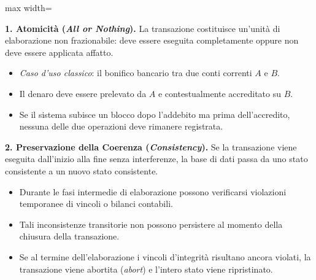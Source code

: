 \documentclass[12pt]{extarticle}
\begin{document}
\begin{center}
\begin{adjustbox}{max width=\linewidth}
\end{adjustbox}
\end{center}

\noindent \textbf{1. Atomicità (\textit{All or Nothing}).} La transazione costituisce un'unità di elaborazione non frazionabile: deve essere eseguita completamente oppure non deve essere applicata affatto.
\begin{itemize}
    \item \textit{Caso d'uso classico}: il bonifico bancario tra due conti correnti $A$ e $B$.
    \item Il denaro deve essere prelevato da $A$ e contestualmente accreditato su $B$.
    \item Se il sistema subisce un blocco dopo l'addebito ma prima dell'accredito, nessuna delle due operazioni deve rimanere registrata.
\end{itemize}

\medskip
\noindent \textbf{2. Preservazione della Coerenza (\textit{Consistency}).} Se la transazione viene eseguita dall'inizio alla fine senza interferenze, la base di dati passa da uno stato consistente a un nuovo stato consistente.
\begin{itemize}
    \item Durante le fasi intermedie di elaborazione possono verificarsi violazioni temporanee di vincoli o bilanci contabili.
    \item Tali inconsistenze transitorie non possono persistere al momento della chiusura della transazione.
    \item Se al termine dell'elaborazione i vincoli d'integrità risultano ancora violati, la transazione viene abortita (\textit{abort}) e l'intero stato viene ripristinato.
\end{itemize}
\end{document}

